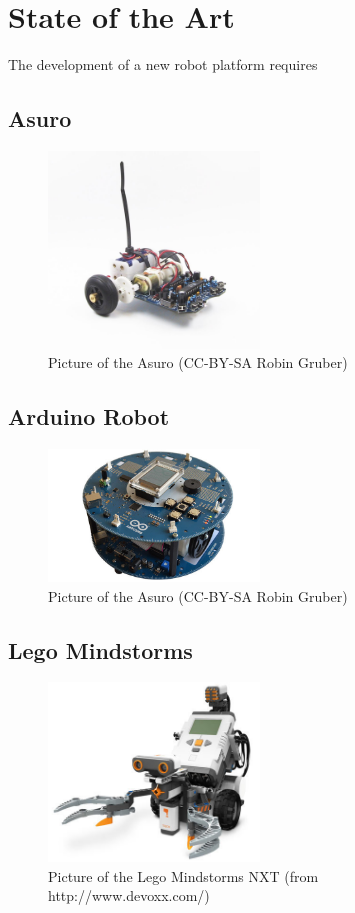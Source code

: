 \documentclass[twocolumn]{article}
\begin{document}
\section{State of the Art}
The development of a new robot platform requires

\subsection{Asuro}
\begin{figure}[h!]
  \centering
  \includegraphics[width=0.5\textwidth]{images/asuro.jpg}
  \caption{Picture of the Asuro (CC-BY-SA Robin Gruber)}
\end{figure}
\subsection{Arduino Robot}
\begin{figure}[h!]
  \centering
  \includegraphics[width=0.5\textwidth]{images/arduinorobot.jpg}
  \caption{Picture of the Asuro (CC-BY-SA Robin Gruber)}
\end{figure}
\subsection{Lego Mindstorms}
\begin{figure}[h!]
  \centering
  \includegraphics[width=0.5\textwidth]{images/mindstorms.jpg}
  \caption{Picture of the Lego Mindstorms NXT (from http://www.devoxx.com/)}
\end{figure}
\end{document}

